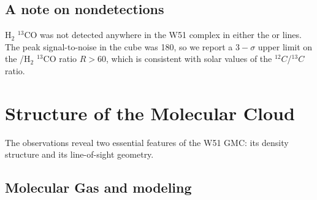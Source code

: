 % 


\subsection{A note on nondetections}
H$_2$ $^{13}$CO was not detected anywhere in the W51 complex in either the
\oneone or \twotwo lines.  The peak signal-to-noise in the \oneone cube was
180, so we report a $3-\sigma$ upper limit on the \formaldehyde/H$_2$ $^{13}$CO
ratio $R>60$, which is consistent with solar values of the $^{12}C$/$^{13}C$
ratio.

\section{Structure of the Molecular Cloud}
The \formaldehyde observations reveal two essential features of the W51 GMC:
its density structure and its line-of-sight geometry.

\subsection{Molecular Gas and \formaldehyde modeling}
\label{sec:h2co}

